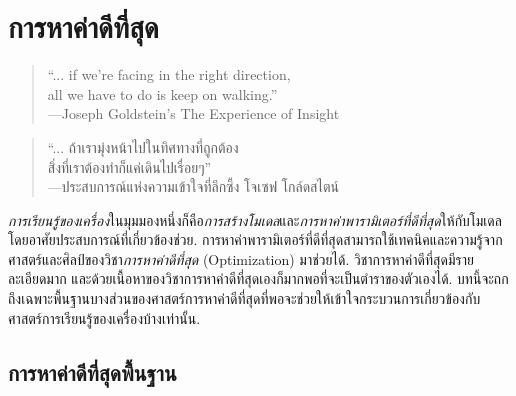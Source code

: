 \chapter{การหาค่าดีที่สุด}
\label{chapter: Optimization}



\begin{verse}
``... if we’re facing in the right direction, \\
all we have to do is keep on walking.'' \\
---Joseph Goldstein’s The Experience of Insight 
\end{verse}

\begin{verse}
``... ถ้าเรามุ่งหน้าไปในทิศทางที่ถูกต้อง \\
สิ่งที่เราต้องทำก็แค่เดินไปเรื่อยๆ'' \\
---ประสบการณ์แห่งความเข้าใจที่ลึกซึ้ง โจเซฟ โกล์ดสไตน์ 
\end{verse}

\textit{การเรียนรู้ของเครื่อง}ในมุมมองหนึ่งก็คือ\textit{การสร้างโมเดล}และ\textit{การหาค่าพารามิเตอร์ที่ดีที่สุด}ให้กับโมเดล โดยอาศัยประสบการณ์ที่เกี่ยวข้องช่วย.
การหาค่าพารามิเตอร์ที่ดีที่สุดสามารถใช้เทคนิคและความรู้จากศาสตร์และศิลป์ของวิชา\textit{การหาค่าดีที่สุด} (Optimization) มาช่วยได้.
วิชาการหาค่าดีที่สุดมีรายละเอียดมาก และด้วยเนื้อหาของวิชาการหาค่าดีที่สุดเองก็มากพอที่จะเป็นตำราของตัวเองได้.
บทนี้จะถกถึงเฉพาะพื้นฐานบางส่วนของศาสตร์การหาค่าดีที่สุดที่พอจะช่วยให้เข้าใจกระบวนการเกี่ยวข้องกับศาสตร์การเรียนรู้ของเครื่องบ้างเท่านั้น.

\section{การหาค่าดีที่สุดพื้นฐาน}
\label{section: Optimization}

